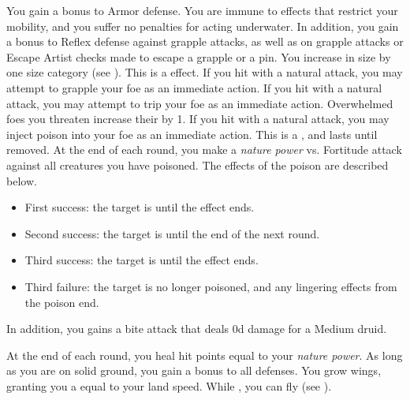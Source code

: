          You gain a  bonus to Armor defense.
         You are immune to effects that restrict your mobility, and you suffer no penalties for acting underwater.
        In addition, you gain a  bonus to Reflex defense against grapple attacks, as well as on grapple attacks or Escape Artist checks made to escape a grapple or a pin.
        You increase in size by one size category (see ).
        This is a  effect.
        If you hit with a natural attack, you may attempt to grapple your foe as an immediate action.
        If you hit with a natural attack, you may attempt to trip your foe as an immediate action.
        Overwhelmed foes you threaten increase their  by 1.
        If you hit with a natural attack, you may inject poison into your foe as an immediate action.
        This is a , and lasts until removed.
        At the end of each round, you make a \textit{nature power} vs. Fortitude attack against all creatures you have poisoned.
        The effects of the poison are described below.
        \begin{itemize}
            \item First success: the target is \sickened until the effect ends.
            \item Second success: the target is \staggered until the end of the next round.
            \item Third success: the target is \nauseated until the effect ends.
            \item Third failure: the target is no longer poisoned, and any lingering effects from the poison end.
        \end{itemize}
        \par In addition, you gains a bite attack that deals \plus0d damage for a Medium druid.

        At the end of each round, you heal hit points equal to your \textit{nature power}.
         As long as you are on solid ground, you gain a  bonus to all defenses.
        You grow wings, granting you a  equal to your land speed.
        While , you can fly (see ).

